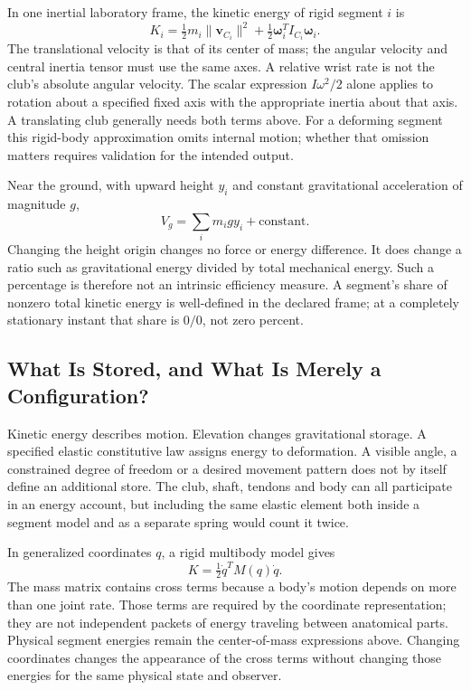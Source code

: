 In one inertial laboratory frame, the kinetic energy of rigid segment $i$ is
\begin{equation}
K_i=\tfrac12m_i\lVert\mathbf v_{C_i}\rVert^2
 +\tfrac12\boldsymbol\omega_i^T I_{C_i}\boldsymbol\omega_i.
\label{eq:kinetic_energy_segment}
\end{equation}
The translational velocity is that of its center of mass; the angular velocity
and central inertia tensor must use the same axes. A relative wrist rate is not
the club's absolute angular velocity. The scalar expression $I\omega^2/2$
alone applies to rotation about a specified fixed axis with the appropriate
inertia about that axis. A translating club generally needs both terms above.
For a deforming segment this rigid-body approximation omits internal motion;
whether that omission matters requires validation for the intended output.

Near the ground, with upward height $y_i$ and constant gravitational acceleration
of magnitude $g$,
\begin{equation}
V_g=\sum_i m_i g y_i+\text{constant}.
\label{eq:potential_energy_segment}
\end{equation}
Changing the height origin changes no force or energy difference. It does change
a ratio such as gravitational energy divided by total mechanical energy. Such a
percentage is therefore not an intrinsic efficiency measure. A segment's share
of nonzero total kinetic energy is well-defined in the declared frame; at a
completely stationary instant that share is $0/0$, not zero percent.

\subsection{What Is Stored, and What Is Merely a Configuration?}

Kinetic energy describes motion. Elevation changes gravitational storage. A
specified elastic constitutive law assigns energy to deformation. A visible
angle, a constrained degree of freedom or a desired movement pattern does not
by itself define an additional store. The club, shaft, tendons and body can all
participate in an energy account, but including the same elastic element both
inside a segment model and as a separate spring would count it twice.

In generalized coordinates $q$, a rigid multibody model gives
\begin{equation}
K=\tfrac12\dot q^T M(q)\dot q.
\label{eq:kinetic_energy_compact}
\end{equation}
The mass matrix contains cross terms because a body's motion depends on more
than one joint rate. Those terms are required by the coordinate representation;
they are not independent packets of energy traveling between anatomical parts.
Physical segment energies remain the center-of-mass expressions above. Changing
coordinates changes the appearance of the cross terms without changing those
energies for the same physical state and observer.

